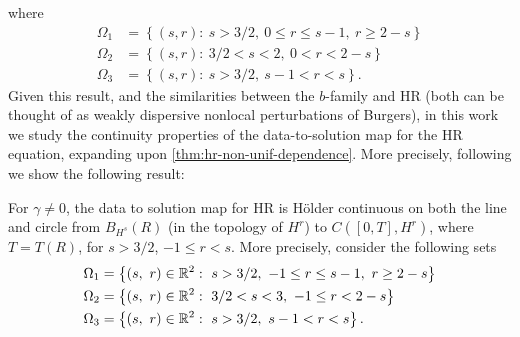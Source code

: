 %
%
where
\begin{equation*}
\begin{split}
\Omega_{1} & = \left\{ (s, r): \   s > 3/2, \ 0 \le r \le s-1, \  r \ge 2-s \right\}
\\
\Omega_{2} & = \left\{(s, r): \  3/2 < s < 2, \ 0 < r < 2-s   \right\}
\\
\Omega_{3} & = \left\{ (s,r): \  s > 3/2, \ s-1 < r < s  \right\}.
\end{split}
\end{equation*}
Given this result, and the similarities between the $b$-family and HR (both can
be thought of as weakly dispersive nonlocal perturbations of Burgers), in this
work we study the continuity properties of the
data-to-solution map for the HR equation, expanding upon \cref{thm:hr-non-unif-dependence}. More precisely, following \cite{Chen:2011fk} we show
the following result:
%
%
\begin{theorem}
For $\gamma \neq 0$, the
data to solution map for HR is H\"older continuous on both the line and circle from $B_{H^{s}}(R)$ (in
the topology of $H^{r}$) to $C([0, T], H^{r})$, where $T = T(R)$, for $s >
3/2$, $-1 \le r < s$. More
precisely, consider the following sets 
%
%
\begin{equation*}
\begin{split}
& \Omega_{1} = \left\{ (s, \ r) \in \mathbb{R}^{2}:
\ s>3/2, \ -1 \le r \le s-1, \  r \ge 2 -s  \right\}
\\
& \Omega_{2} = \left\{ (s, \ r) \in \mathbb{R}^{2}:
\ 3/2 < s < 3, \ -1 \le r < 2-s \right\}
\\
& \Omega_{3} = \left\{ (s, \ r) \in \mathbb{R}^{2}:
\  s>3/2, \  s-1 < r < s  \right\}.
\end{split}
\end{equation*}
%
%
\label{thm:main-thm}
\end{theorem}
%
\begin{center}
\end{center}
